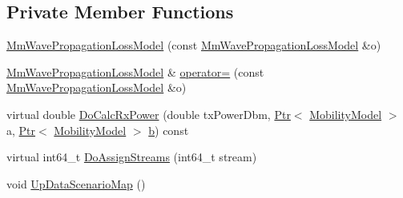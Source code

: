 \subsection*{Private Member Functions}
\begin{DoxyCompactItemize}
\item 
\hyperlink{classMmWavePropagationLossModel_aca09eb98bedaaa5596d7217f759f7486}{Mm\+Wave\+Propagation\+Loss\+Model} (const \hyperlink{classMmWavePropagationLossModel}{Mm\+Wave\+Propagation\+Loss\+Model} \&o)
\item 
\hyperlink{classMmWavePropagationLossModel}{Mm\+Wave\+Propagation\+Loss\+Model} \& \hyperlink{classMmWavePropagationLossModel_a15f323c6be02db440a6c5961fb1e396a}{operator=} (const \hyperlink{classMmWavePropagationLossModel}{Mm\+Wave\+Propagation\+Loss\+Model} \&o)
\item 
virtual double \hyperlink{classMmWavePropagationLossModel_a28b879dc3d4404dd807b50527c71e51c}{Do\+Calc\+Rx\+Power} (double tx\+Power\+Dbm, \hyperlink{classns3_1_1Ptr}{Ptr}$<$ \hyperlink{classns3_1_1MobilityModel}{Mobility\+Model} $>$ a, \hyperlink{classns3_1_1Ptr}{Ptr}$<$ \hyperlink{classns3_1_1MobilityModel}{Mobility\+Model} $>$ \hyperlink{lte__pathloss_8m_a21ad0bd836b90d08f4cf640b4c298e7c}{b}) const 
\item 
virtual int64\+\_\+t \hyperlink{classMmWavePropagationLossModel_a4601a61d00d4ea9ed8e6ff3b19480460}{Do\+Assign\+Streams} (int64\+\_\+t stream)
\item 
void \hyperlink{classMmWavePropagationLossModel_a36267981dfdc2c694dfad2952ca23f6a}{Up\+Data\+Scenario\+Map} ()
\end{DoxyCompactItemize}
